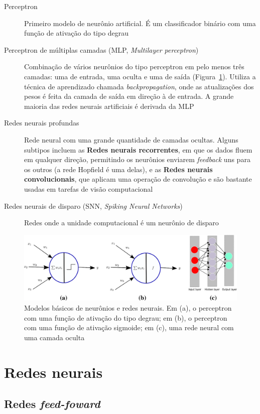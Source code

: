 \begin{description}
	\item[Perceptron] Primeiro modelo de neurônio artificial. É um classificador binário com uma função de ativação do tipo degrau
	\item[Perceptron de múltiplas camadas (MLP, \textit{Multilayer perceptron})] Combinação de vários neurônios do tipo perceptron em pelo menos três camadas: uma de entrada, uma oculta e uma de saída (Figura~\ref*{fig:modelosmlp}). Utiliza a técnica de aprendizado chamada \textit{backpropagation}, onde as atualizações dos pesos é feita da camada de saída em direção à de entrada. A grande maioria das redes neurais artificiais é derivada da MLP
	\item[Redes neurais profundas] Rede neural com uma grande quantidade de camadas ocultas. Alguns subtipos incluem as \textbf{Redes neurais recorrentes}, em que os dados fluem em qualquer direção, permitindo os neurônios enviarem \textit{feedback} uns para os outros (a rede Hopfield é uma delas), e as \textbf{Redes neurais convolucionais}, que aplicam uma operação de convolução e são bastante usadas em tarefas de visão computacional
	\item[Redes neurais de disparo (SNN, \textit{Spiking Neural Networks})] Redes onde a unidade computacional é um neurônio de disparo
\end{description}

\begin{figure}[h!]
	\centering
	\caption{Modelos básicos de neurônios e redes neurais. Em (a), o perceptron com uma função de ativação do tipo degrau; em (b), o perceptron com uma função de ativação sigmoide; em (c), uma rede neural com uma camada oculta}
	\label{fig:modelosmlp}
	\includegraphics[width=0.9\linewidth]{figs/modelos_mlp}
\end{figure}


\section{Redes neurais}\label{sec:redesneurais}
\subsection{Redes \textit{feed-foward}}

